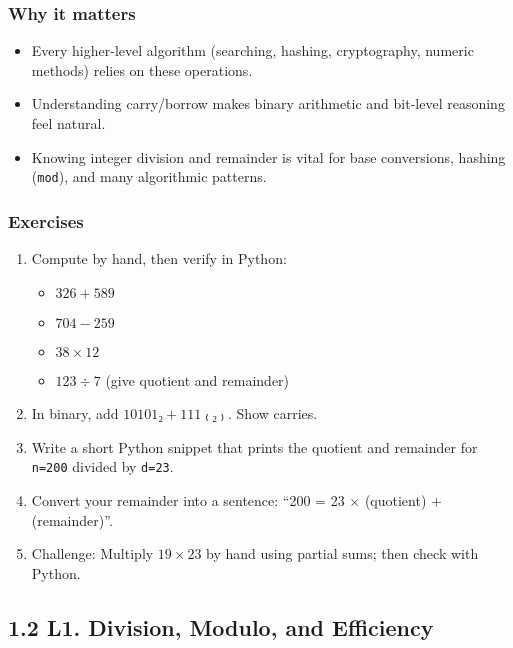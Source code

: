 \documentclass[
  letterpaper,
  DIV=11,
  numbers=noendperiod]{scrreprt}
\providecommand{\tightlist}{%
  \setlength{\itemsep}{0pt}\setlength{\parskip}{0pt}}
\begin{document}
\subsubsection{Why it matters}\label{why-it-matters-3}

\begin{itemize}
\tightlist
\item
  Every higher-level algorithm (searching, hashing, cryptography,
  numeric methods) relies on these operations.
\item
  Understanding carry/borrow makes binary arithmetic and bit-level
  reasoning feel natural.
\item
  Knowing integer division and remainder is vital for base conversions,
  hashing (\texttt{mod}), and many algorithmic patterns.
\end{itemize}

\subsubsection{Exercises}\label{exercises-3}

\begin{enumerate}
\def\labelenumi{\arabic{enumi}.}
\item
  Compute by hand, then verify in Python:

  \begin{itemize}
  \tightlist
  \item
    \(326 + 589\)
  \item
    \(704 - 259\)
  \item
    \(38 \times 12\)
  \item
    \(123 \div 7\) (give quotient and remainder)
  \end{itemize}
\item
  In binary, add \(10101₂ + 111₍₂₎\). Show carries.
\item
  Write a short Python snippet that prints the quotient and remainder
  for \texttt{n=200} divided by \texttt{d=23}.
\item
  Convert your remainder into a sentence: ``200 = 23 × (quotient) +
  (remainder)''.
\item
  Challenge: Multiply \(19 \times 23\) by hand using partial sums; then
  check with Python.
\end{enumerate}

\subsection{1.2 L1. Division, Modulo, and
Efficiency}\label{l1.-division-modulo-and-efficiency}
\end{document}
